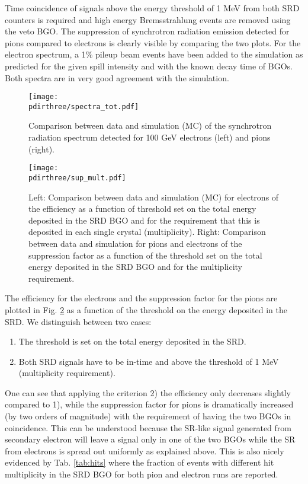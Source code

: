Time coincidence of signals above the energy threshold of 1 MeV from both SRD counters is required and high energy Bremsstrahlung events are removed using the veto BGO.
The suppression of synchrotron radiation emission detected for pions compared to electrons is clearly visible by comparing the two plots. For the electron spectrum, a 1\% pileup beam events have been added to the simulation as predicted for the given spill intensity and with the known decay time of BGOs.  Both spectra are in very good agreement with the simulation.

\begin{figure}[htb!]
  \centering
  \texttt{[image: \\pdirthree/spectra\_tot.pdf]}
  \caption[SRD comparison between data and MC]{Comparison between data and simulation (MC) of the synchrotron radiation spectrum detected for 100 GeV electrons (left) and pions (right). }
  \label{fig:comp_spectra}
\end{figure} 

\begin{figure}[htb!]
  \centering
  \texttt{[image: \\pdirthree/sup\_mult.pdf]}
  \caption[efficiency and rejection power of the SRD cut]{Left: Comparison between data and simulation (MC) for electrons of the efficiency as a function of threshold set on the total energy deposited in the SRD BGO and for the requirement that this is deposited in each single crystal (multiplicity). Right: Comparison between data and simulation for pions and electrons of the suppression factor as a function of the threshold set on the total energy deposited in the SRD BGO and for the multiplicity requirement.}
  \label{fig:sup_mult}
\end{figure}

The efficiency for the electrons and the suppression factor for the pions are plotted in Fig. \ref{fig:sup_mult} as a function of the threshold on the energy deposited in the SRD. We distinguish between two cases:
\begin{enumerate}
\item The threshold is set on the total energy deposited in the SRD.
\item Both SRD signals have to be in-time and above the threshold of 1 MeV (multiplicity requirement).
\end{enumerate}
One can see that applying the criterion 2) the efficiency only decreases slightly compared to 1), while the suppression factor for pions is dramatically increased (by two orders of magnitude) with the requirement of having the two BGOs in coincidence.
This can be understood because the SR-like signal generated from secondary electron will leave a signal only in one of the two BGOs while the SR from electrons is spread out uniformly as explained above. 
This is also nicely evidenced by Tab. \ref{tab:hits} where the fraction of events with different hit multiplicity in the SRD BGO for both pion and electron runs are reported.

